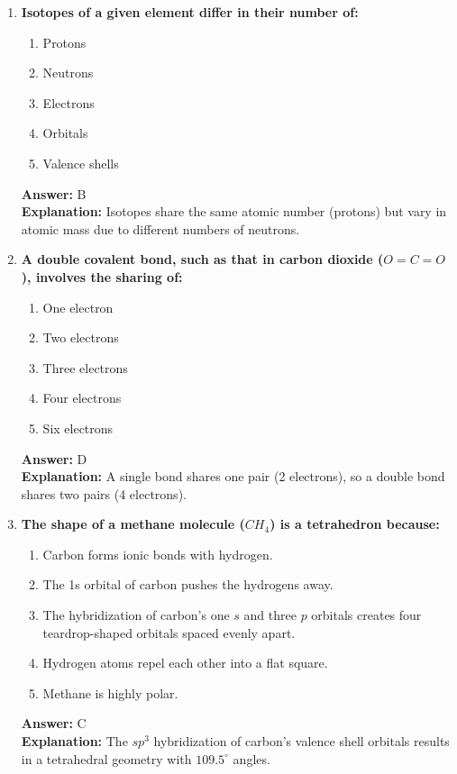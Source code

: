 \documentclass[11pt, a4paper]{article}
\begin{document}
\begin{enumerate}
\item \textbf{Isotopes of a given element differ in their number of:}
\begin{enumerate}[label=\Alph*.]
    \item Protons
    \item Neutrons
    \item Electrons
    \item Orbitals
    \item Valence shells
\end{enumerate}
\textbf{Answer:} B \\
\textbf{Explanation:} Isotopes share the same atomic number (protons) but vary in atomic mass due to different numbers of neutrons.

\item \textbf{A double covalent bond, such as that in carbon dioxide ($O=C=O$), involves the sharing of:}
\begin{enumerate}[label=\Alph*.]
    \item One electron
    \item Two electrons
    \item Three electrons
    \item Four electrons
    \item Six electrons
\end{enumerate}
\textbf{Answer:} D \\
\textbf{Explanation:} A single bond shares one pair (2 electrons), so a double bond shares two pairs (4 electrons).

\item \textbf{The shape of a methane molecule ($CH_4$) is a tetrahedron because:}
\begin{enumerate}[label=\Alph*.]
    \item Carbon forms ionic bonds with hydrogen.
    \item The 1s orbital of carbon pushes the hydrogens away.
    \item The hybridization of carbon's one $s$ and three $p$ orbitals creates four teardrop-shaped orbitals spaced evenly apart.
    \item Hydrogen atoms repel each other into a flat square.
    \item Methane is highly polar.
\end{enumerate}
\textbf{Answer:} C \\
\textbf{Explanation:} The $sp^3$ hybridization of carbon's valence shell orbitals results in a tetrahedral geometry with $109.5^\circ$ angles.


\end{enumerate}
\end{document}
